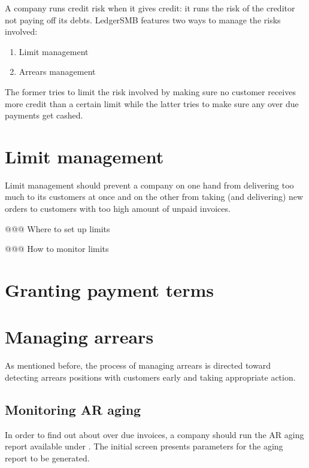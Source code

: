 A company runs credit risk when it gives credit: it runs the risk of the
creditor not paying off its debts.  LedgerSMB features two ways to manage
the risks involved:

\begin{enumerate}
\item Limit management
\item Arrears management
\end{enumerate}

The former tries to limit the risk involved by making sure no \gls{customer}
receives more credit than a certain limit while the latter tries to
make sure any over due payments get cashed.

\section{Limit management}
\label{sec-business-processes-credit-risk-limit-management}

Limit management should prevent a company on one hand from delivering too much
to its customers at once and on the other from taking (and delivering) new orders
to customers with too high amount of unpaid invoices.



@@@ Where to set up limits

@@@ How to monitor limits



\section{Granting payment terms}
\label{sec-business-processes-credit-risk-payment-terms}

\section{Managing arrears}
\label{sec-business-processes-credit-risk-managing-arrears}

As mentioned before, the process of managing arrears is directed toward
detecting arrears positions with customers early and taking appropriate
action.


\subsection{Monitoring AR aging}
\label{subsec-business-processes-credit-risk-monitoring-arrears}

In order to find out about over due invoices, a company should run the AR
aging report available under .
The initial screen presents parameters for the aging report to be generated.

